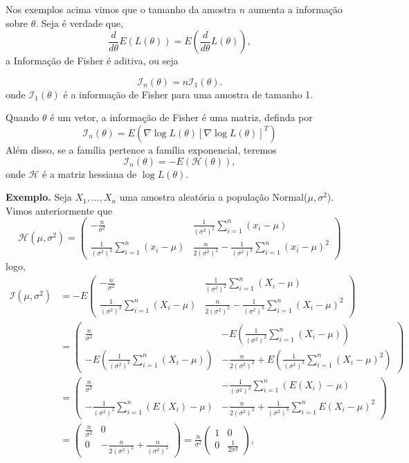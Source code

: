 \documentclass[
  letterpaper,
  DIV=11,
  numbers=noendperiod]{scrartcl}
\begin{document}
Nos exemplos acima vimos que o tamanho da amostra \(n\) aumenta a
informação sobre \(\theta\). Seja é verdade que,
\[\frac{d}{d\theta}E(L(\theta))=E\left(\frac{d}{d\theta}L(\theta)\right),\]
a Informação de Fisher é aditiva, ou seja

\[\mathcal{I}_n(\theta)=n\mathcal{I}_{1}(\theta).
\] onde \(\mathcal{I}_1(\theta)\) é a informação de Fisher para uma
amostra de tamanho 1.

Quando \(\theta\) é um vetor, a informação de Fisher é uma matriz,
definda por
\[\mathcal{I}_n(\theta)=E\left(\nabla\log L(\theta)\left[\nabla\log L(\theta)\right]^T\right)\]
Além disso, se a família pertence a família exponencial, teremos
\[\mathcal{I}_n(\theta)=-E\left(\mathcal{H}(\theta)\right),\] onde
\(\mathcal{H}\) é a matriz hessiana de \(\log L(\theta)\).

\textbf{Exemplo.} Seja \(X_1,\ldots,X_n\) uma amostra aleatória a
população Normal(\(\mu,\sigma^2\)). Vimos anteriormente que
\[\mathcal{H}(\mu,\sigma^2)=\left(\begin{array}{cc}
-\frac{n}{\sigma^2} & \frac{1}{(\sigma^2)^2}\sum_{i=1}^{n}(x_i-\mu) \\\frac{1}{(\sigma^2)^2}\sum_{i=1}^{n}(x_i-\mu) & \frac{n}{2(\sigma^2)^2} -\frac{1}{\left(\sigma^2\right)^3}\sum_{i=1}^{n}(x_i-\mu)^2
\end{array}\right)\] logo, \[\begin{align*}
\mathcal{I}(\mu,\sigma^2)&=-E\left(\begin{array}{cc}
-\frac{n}{\sigma^2} & \frac{1}{(\sigma^2)^2}\sum_{i=1}^{n}(X_i-\mu) \\\frac{1}{(\sigma^2)^2}\sum_{i=1}^{n}(X_i-\mu) & \frac{n}{2(\sigma^2)^2} -\frac{1}{\left(\sigma^2\right)^3}\sum_{i=1}^{n}(X_i-\mu)^2
\end{array}\right)\\
&=\left(\begin{array}{cc}
\frac{n}{\sigma^2} & -E\left(\frac{1}{(\sigma^2)^2}\sum_{i=1}^{n}(X_i-\mu)\right) \\
-E\left(\frac{1}{(\sigma^2)^2}\sum_{i=1}^{n}(X_i-\mu)\right) & -\frac{n}{2(\sigma^2)^2} +E\left(\frac{1}{\left(\sigma^2\right)^3}\sum_{i=1}^{n}(X_i-\mu)^2\right)
\end{array}\right)\\
&=\left(\begin{array}{cc}
\frac{n}{\sigma^2} & -\frac{1}{(\sigma^2)^2}\sum_{i=1}^{n}(E(X_i)-\mu) \\
-\frac{1}{(\sigma^2)^2}\sum_{i=1}^{n}(E(X_i)-\mu) & -\frac{n}{2(\sigma^2)^2} +\frac{1}{\left(\sigma^2\right)^3}\sum_{i=1}^{n}E(X_i-\mu)^2
\end{array}\right)\\
&=\left(\begin{array}{cc}
\frac{n}{\sigma^2} & 0 \\
0 & -\frac{n}{2(\sigma^2)^2} +\frac{n}{\left(\sigma^2\right)^2}
\end{array}\right)=\frac{n}{\sigma^2}\left(\begin{array}{cc}
1 & 0 \\
0 & \frac{1}{2\sigma^2}
\end{array}\right),
\end{align*}\]
\end{document}
